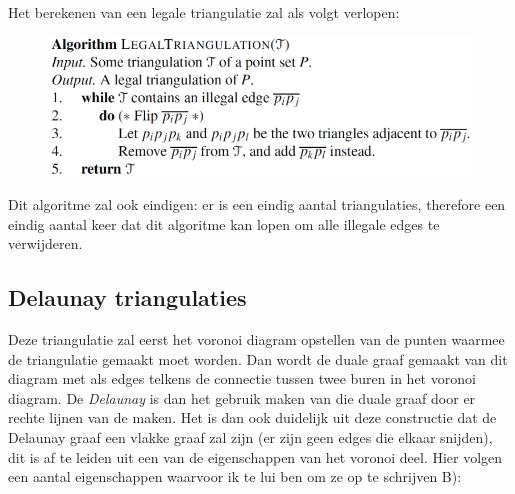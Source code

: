 \documentclass[12pt,a4paper]{article}
\begin{document}
	Het berekenen van een legale triangulatie zal als volgt verlopen: 
	\begin{figure}[H]
		\centering
		\includegraphics[width=0.7\linewidth]{afbeeldingen/delaunay/legalTranslation}
		\label{fig:legaltranslation}
	\end{figure}

	Dit algoritme zal ook eindigen: er is een eindig aantal triangulaties, therefore een eindig aantal keer dat dit algoritme kan lopen om alle illegale edges te verwijderen. 
	
	
	\subsection{Delaunay triangulaties}
	Deze triangulatie zal eerst het voronoi diagram opstellen van de punten waarmee de triangulatie gemaakt moet worden. Dan wordt de duale graaf gemaakt van dit diagram met als edges telkens de connectie tussen twee buren in het voronoi diagram. De \textit{Delaunay} is dan het gebruik maken van die duale graaf door er rechte lijnen van de maken. Het is dan ook duidelijk uit deze constructie dat de Delaunay graaf een vlakke graaf zal zijn (er zijn geen edges die elkaar snijden), dit is af te leiden uit een van de eigenschappen van het voronoi deel. Hier volgen een aantal eigenschappen waarvoor ik te lui ben om ze op te schrijven B): 
	
\end{document}
